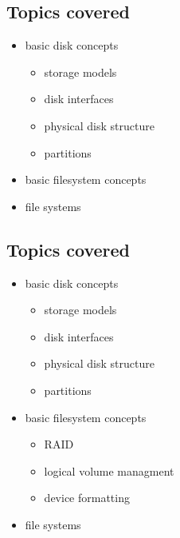 \documentclass[xga]{xdvislides}
\begin{document}
\subsection{Topics covered}
\begin{itemize}
	\item basic disk concepts
		\begin{itemize}
			\item storage models
			\item disk interfaces
			\item physical disk structure
			\item partitions
		\end{itemize}
	\item basic filesystem concepts
	\item file systems
\end{itemize}

\subsection{Topics covered}
\begin{itemize}
	\item basic disk concepts
		\begin{itemize}
			\item storage models
			\item disk interfaces
			\item physical disk structure
			\item partitions
		\end{itemize}
	\item basic filesystem concepts
		\begin{itemize}
			\item RAID
			\item logical volume managment
			\item device formatting
		\end{itemize}
	\item file systems
\end{itemize}
\end{document}
